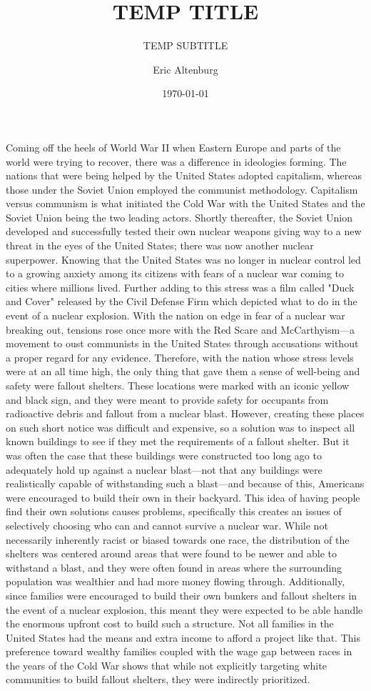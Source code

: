 \documentclass[12pt]{turabian-researchpaper}
\title{TEMP TITLE}
\subtitle{TEMP SUBTITLE}
\author{Eric Altenburg}
\date{\today}
\begin{document}
\maketitle

Coming off the heels of World War II when Eastern Europe and parts of the world were trying to recover, there was a difference in ideologies forming. The nations that were being helped by the United States adopted capitalism, whereas those under the Soviet Union employed the communist methodology. Capitalism versus communism is what initiated the Cold War with the United States and the Soviet Union being the two leading actors. Shortly thereafter, the Soviet Union developed and successfully tested their own nuclear weapons giving way to a new threat in the eyes of the United States; there was now another nuclear superpower. Knowing that the United States was no longer in nuclear control led to a growing anxiety among its citizens with fears of a nuclear war coming to cities where millions lived. Further adding to this stress was a film called "Duck and Cover" released by the Civil Defense Firm which depicted what to do in the event of a nuclear explosion. With the nation on edge in fear of a nuclear war breaking out, tensions rose once more with the Red Scare and McCarthyism—a movement to oust communists in the United States through accusations without a proper regard for any evidence. Therefore, with the nation whose stress levels were at an all time high, the only thing that gave them a sense of well-being and safety were fallout shelters. These locations were marked with an iconic yellow and black sign, and they were meant to provide safety for occupants from radioactive debris and fallout from a nuclear blast. However, creating these places on such short notice was difficult and expensive, so a solution was to inspect all known buildings to see if they met the requirements of a fallout shelter. But it was often the case that these buildings were constructed too long ago to adequately hold up against a nuclear blast—not that any buildings were realistically capable of withstanding such a blast—and because of this, Americans were encouraged to build their own in their backyard. This idea of having people find their own solutions causes problems, specifically this creates an issues of selectively choosing who can and cannot survive a nuclear war. While not necessarily inherently racist or biased towards one race, the distribution of the shelters was centered around areas that were found to be newer and able to withstand a blast, and they were often found in areas where the surrounding population was wealthier and had more money flowing through. Additionally, since families were encouraged to build their own bunkers and fallout shelters in the event of a nuclear explosion, this meant they were expected to be able handle the enormous upfront cost to build such a structure. Not all families in the United States had the means and extra income to afford a project like that. This preference toward wealthy families coupled with the wage gap between races in the years of the Cold War shows that while not explicitly targeting white communities to build fallout shelters, they were indirectly prioritized. 
\end{document}
